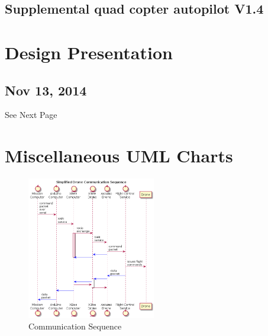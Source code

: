 \documentclass[pdftex,11pt]{article}
\begin{document}
	\subsection{Supplemental quad copter autopilot V1.4}
	

\clearpage


\section{Design Presentation}
\label{sec:DesignPresentation}
\subsection{Nov 13, 2014}
See Next Page









\clearpage
\appendix
\appendixpage	
\addappheadtotoc

\section{Miscellaneous UML Charts}
\label{sec:appUML}
\begin{figure}[!h]
	\centering
		\includegraphics[width=0.5\textwidth]{./plantUML/droneControlSequence.png}
	\caption{Communication Sequence}
	\label{fig:comseq}
\end{figure}
\end{document}
